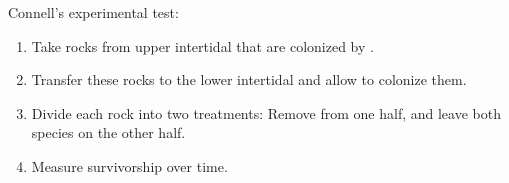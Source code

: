 \begin{frame}[t]
    \begin{adjustwidth}{-2em}{-1.5em}
        Connell's experimental test:

        \begin{enumerate}[<+->]
            \item Take rocks from upper intertidal that are colonized by
                .

                \vspace{5mm}
            \item Transfer these rocks to the lower intertidal and allow
                 to colonize them.

                \vspace{5mm}
            \item Divide each rock into two treatments: Remove
                 from one half, and leave both species on the
                other half.

                \vspace{5mm}
            \item Measure survivorship over time.
        \end{enumerate}

    \end{adjustwidth}
\end{frame}

